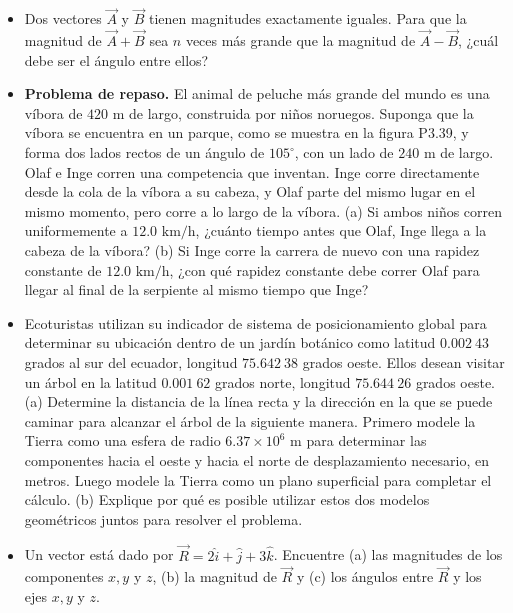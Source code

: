 \documentclass[11pt,a4paper]{article}
\begin{document}
\newpage

\begin{itemize}
    \item[\textbf{38.}] Dos vectores $\vec{A}$ y $\vec{B}$ tienen magnitudes exactamente iguales. Para que la magnitud de $\vec{A} + \vec{B}$ sea $n$ veces más grande que la magnitud de $\vec{A} - \vec{B}$, ¿cuál debe ser el ángulo entre ellos?
    \vspace*{6cm}

    \item[\textbf{39.}] \textbf{Problema de repaso.} El animal de peluche más grande del mundo es una víbora de $420 \text{ m}$ de largo, construida por niños noruegos. Suponga que la víbora se encuentra en un parque, como se muestra en la figura P3.39, y forma dos lados rectos de un ángulo de $105^\circ$, con un lado de $240 \text{ m}$ de largo. Olaf e Inge corren una competencia que inventan. Inge corre directamente desde la cola de la víbora a su cabeza, y Olaf parte del mismo lugar en el mismo momento, pero corre a lo largo de la víbora. (a) Si ambos niños corren uniformemente a $12.0 \text{ km/h}$, ¿cuánto tiempo antes que Olaf, Inge llega a la cabeza de la víbora? (b) Si Inge corre la carrera de nuevo con una rapidez constante de $12.0 \text{ km/h}$, ¿con qué rapidez constante debe correr Olaf para llegar al final de la serpiente al mismo tiempo que Inge?
    \vspace*{6cm}

    \item[\textbf{40.}] Ecoturistas utilizan su indicador de sistema de posicionamiento global para determinar su ubicación dentro de un jardín botánico como latitud $0.002\ 43$ grados al sur del ecuador, longitud $75.642\ 38$ grados oeste. Ellos desean visitar un árbol en la latitud $0.001\ 62$ grados norte, longitud $75.644\ 26$ grados oeste. (a) Determine la distancia de la línea recta y la dirección en la que se puede caminar para alcanzar el árbol de la siguiente manera. Primero modele la Tierra como una esfera de radio $6.37 \times 10^6 \text{ m}$ para determinar las componentes hacia el oeste y hacia el norte de desplazamiento necesario, en metros. Luego modele la Tierra como un plano superficial para completar el cálculo. (b) Explique por qué es posible utilizar estos dos modelos geométricos juntos para resolver el problema.
    \vspace*{6cm}

    \item[\textbf{41.}] Un vector está dado por $\vec{R} = 2\hat{i} + \hat{j} + 3\hat{k}$. Encuentre (a) las magnitudes de los componentes $x, y$ y $z$, (b) la magnitud de $\vec{R}$ y (c) los ángulos entre $\vec{R}$ y los ejes $x, y$ y $z$.
    \vspace*{6cm}
\end{itemize}
\end{document}
